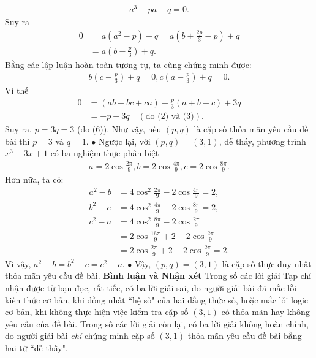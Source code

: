 \begin{multicols}{2}
\begin{align*}
		{a^3} - pa + q = 0.
	\end{align*}
	Suy ra
	\begin{align*}
		0 &= a\left( {{a^2} - p} \right) + q = a\left( {b + \frac{{2p}}{3} - p} \right) + q \\
		&= a\left( {b - \frac{p}{3}} \right) + q.
	\end{align*}
	Bằng các lập luận hoàn toàn tương tự, ta cũng chứng minh được:
	\begin{align*}
		b\left( {c - \frac{p}{3}} \right) + q = 0, c\left( {a - \frac{p}{3}} \right) + q = 0.
	\end{align*}
	Vì thế
	\begin{align*}
		0 &= \left( {ab + bc + ca} \right) - \frac{p}{3}\left( {a + b + c} \right) + 3q \\
		&=  - p + 3q \quad(\text{do ($2$) và ($3$)}).
	\end{align*}
	Suy ra, $p = 3q = 3$ (do ($6$)).
	\vskip 0.05cm
	Như vậy, nếu $(p, q)$ là cặp số thỏa mãn yêu cầu đề bài thì $p = 3$ và $q = 1$.
	\vskip 0.05cm
	$\bullet$ Ngược lại, với $(p, q) = (3, 1)$, dễ thấy, phương trình $x^3 - 3x + 1$ có ba nghiệm thực phân biệt
	\begin{align*}
		a = 2\cos \frac{{2\pi }}{9}, b = 2\cos \frac{{4\pi }}{9}, c = 2\cos \frac{{8\pi }}{9}.
	\end{align*}
	Hơn nữa, ta có:
	\begin{align*}
		{a^2} - b &= 4{\cos ^2}\frac{{2\pi }}{9} - 2\cos \frac{{4\pi }}{9} = 2,\\
		{b^2} - c &= 4{\cos ^2}\frac{{4\pi }}{9} - 2\cos \frac{{8\pi }}{9} = 2,\\
		{c^2} - a &= 4{\cos ^2}\frac{{8\pi }}{9} - 2\cos \frac{{2\pi }}{9} \\
		&= 2\cos \frac{{16\pi }}{9} + 2 - 2\cos \frac{{2\pi }}{9} \\
		&= 2\cos \frac{{2\pi }}{9} + 2 - 2\cos \frac{{2\pi }}{9} = 2.
	\end{align*}
	Vì vậy, ${a^2} - b = {b^2} - c = {c^2} - a$.
	\vskip 0.05cm
	$\bullet$ Vậy, $(p, q) = (3, 1)$ là cặp số thực duy nhất thỏa mãn yêu cầu đề bài.
	\vskip 0.05cm
	\textbf{\color{thachthuctoanhoc}Bình luận và Nhận xét}
	\vskip 0.05cm
	Trong số các lời giải Tạp chí nhận được từ bạn đọc, rất tiếc, có ba lời giải sai, do người giải bài đã mắc lỗi kiến thức cơ bản, khi đồng nhất ``hệ số" của hai đẳng thức số, hoặc mắc lỗi logic cơ bản, khi không thực hiện việc kiểm tra cặp số $(3, 1)$ có thỏa mãn hay không yêu cầu của đề bài. Trong số các lời giải còn lại, có ba lời giải không hoàn chỉnh, do người giải bài \textit{chỉ} chứng minh cặp số $(3, 1)$ thỏa mãn yêu cầu đề bài bằng hai từ ``dễ thấy".

\end{multicols}
